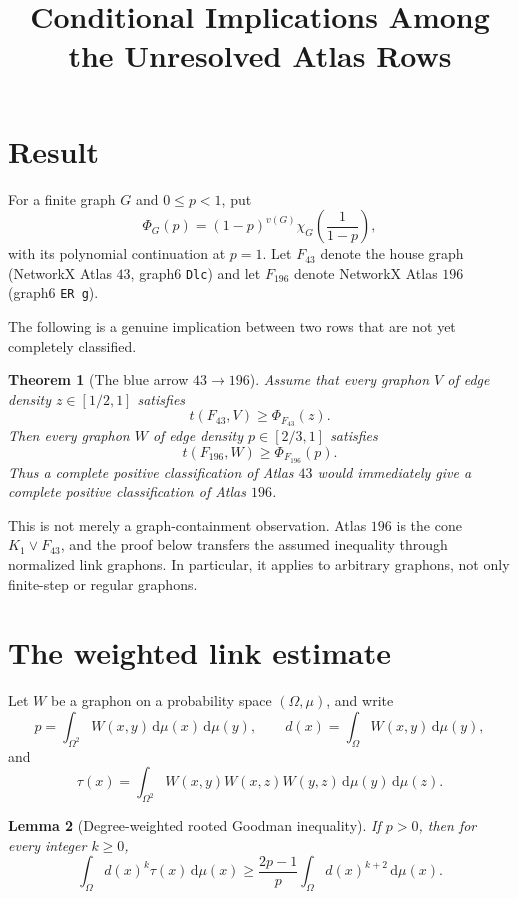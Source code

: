 \documentclass[11pt]{article}
\title{Conditional Implications Among the Unresolved Atlas Rows}
\author{}
\date{}
\newtheorem{theorem}{Theorem}
\newtheorem{lemma}[theorem]{Lemma}
\newcommand{\dd}{\,\mathrm d}
\begin{document}
\maketitle

\section{Result}

For a finite graph $G$ and $0\leq p<1$, put
\[
 \Phi_G(p)=(1-p)^{v(G)}
 \chi_G\!\left(\frac1{1-p}\right),
\]
with its polynomial continuation at $p=1$.  Let $F_{43}$ denote the
house graph (NetworkX Atlas $43$, graph6 \texttt{Dlc}) and let $F_{196}$
denote NetworkX Atlas $196$ (graph6 \texttt{ER\string~g}).

The following is a genuine implication between two rows that are not yet
completely classified.

\begin{theorem}[The blue arrow $43\longrightarrow196$]
\label{thm:arrow}
Assume that every graphon $V$ of edge density $z\in[1/2,1]$ satisfies
\[
 t(F_{43},V)\geq \Phi_{F_{43}}(z).
\]
Then every graphon $W$ of edge density $p\in[2/3,1]$ satisfies
\[
 t(F_{196},W)\geq \Phi_{F_{196}}(p).
\]
Thus a complete positive classification of Atlas $43$ would immediately
give a complete positive classification of Atlas $196$.
\end{theorem}

This is not merely a graph-containment observation.  Atlas $196$ is the
cone $K_1\vee F_{43}$, and the proof below transfers the assumed inequality
through normalized link graphons.  In particular, it applies to arbitrary
graphons, not only finite-step or regular graphons.

\section{The weighted link estimate}

Let $W$ be a graphon on a probability space $(\Omega,\mu)$, and write
\[
 p=\int_{\Omega^2}W(x,y)\dd\mu(x)\dd\mu(y),
 \qquad
 d(x)=\int_\Omega W(x,y)\dd\mu(y),
\]
and
\[
 \tau(x)=\int_{\Omega^2}
 W(x,y)W(x,z)W(y,z)\dd\mu(y)\dd\mu(z).
\]

\begin{lemma}[Degree-weighted rooted Goodman inequality]
\label{lem:weighted}
If $p>0$, then for every integer $k\geq0$,
\[
 \int_\Omega d(x)^k\tau(x)\dd\mu(x)
 \geq \frac{2p-1}{p}
       \int_\Omega d(x)^{k+2}\dd\mu(x).
\]
\end{lemma}
\end{document}
